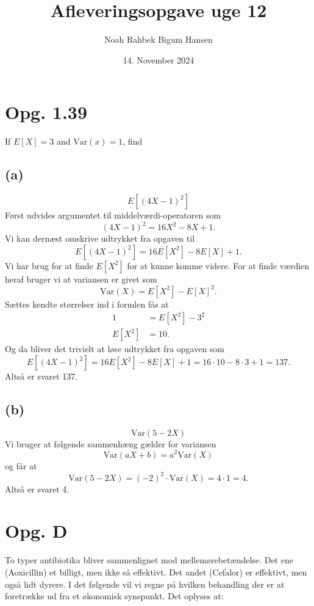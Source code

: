 \documentclass[12pt]{article}
\title{Afleveringsopgave uge 12}
\author{Noah Rahbek Bigum Hansen}
\date{14. November 2024}
\theoremstyle{definition}
\begin{document}
\maketitle

\section*{Opg. 1.39}
If $E[X] = 3$ and $\mathrm{Var}(x) = 1$, find

\subsection*{(a)}
\[ 
  E \left[ (4X-1)^2 \right]
\]
\bigbreak
Først udvides argumentet til middelværdi-operatoren som
\[ 
  (4X-1)^2 = 16X^2 - 8X + 1
.\]
Vi kan dernæst omskrive udtrykket fra opgaven til
\[ 
  E \left[ (4X-1)^2 \right] = 16E \left[X^2 \right] - 8E[X] + 1
.\]
Vi har brug for at finde $E \left[ X^2 \right]$ for at kunne komme videre. For at finde værdien heraf bruger vi at variansen er givet som
\[
  \mathrm{Var}(X) = E \left[ X^2 \right] - E[X]^2
.\]
Sættes kendte størrelser ind i formlen fås at
\begin{align*}
  1 &= E \left[ X^2 \right] - 3^2 \\
  E \left[ X^2 \right] &= 10
.\end{align*}
Og da bliver det trivielt at løse udtrykket fra opgaven som
\[ 
  E \left[ (4X-1)^2 \right] = 16E \left[ X^2 \right] - 8E[X] + 1 = 16 \cdot 10 - 8\cdot 3 + 1 = 137
.\]
Altså er svaret 137.

\subsection*{(b)}
\[ 
  \mathrm{Var}(5-2X)
\]
\bigbreak
Vi bruger at følgende sammenhæng gælder for variansen
\[ 
  \mathrm{Var}(aX + b) = a^2\mathrm{Var}(X)
\]
og får at
\[ 
  \mathrm{Var}(5-2X) = (-2)^2\cdot \mathrm{Var}(X) = 4\cdot 1 = 4
.\]
Altså er svaret 4.



\section*{Opg. D}
To typer antibiotika bliver sammenlignet mod mellemørebetændelse. Det ene (Aoxicillin) et billigt, men ikke så effektivt. Det andet (Cefalor) er effektivt, men også lidt dyrere. I det følgende vil vi regne på hvilken behandling der er at foretrække ud fra et økonomisk synspunkt. Det oplyses at:
\end{document}
